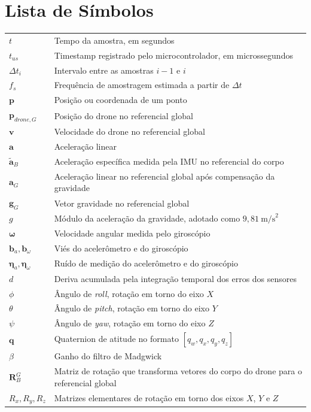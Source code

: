 \chapter*{Lista de Símbolos}

\begin{tabularx}{\textwidth}{>{\raggedright\arraybackslash}p{3.0cm} >{\raggedright\arraybackslash}X}
$t$ & Tempo da amostra, em segundos\\
$t_{us}$ & Timestamp registrado pelo microcontrolador, em microssegundos\\
$\Delta t_i$ & Intervalo entre as amostras $i-1$ e $i$\\
$f_s$ & Frequência de amostragem estimada a partir de $\Delta t$\\

$\mathbf{p}$ & Posição ou coordenada de um ponto\\
$\mathbf{p}_{drone,G}$ & Posição do drone no referencial global\\
$\mathbf{v}$ & Velocidade do drone no referencial global\\
$\mathbf{a}$ & Aceleração linear\\
$\tilde{\mathbf{a}}_B$ & Aceleração específica medida pela IMU no referencial do corpo\\
$\mathbf{a}_G$ & Aceleração linear no referencial global após compensação da gravidade\\
$\mathbf{g}_G$ & Vetor gravidade no referencial global\\
$g$ & Módulo da aceleração da gravidade, adotado como $9{,}81~\text{m/s}^2$\\

$\boldsymbol{\omega}$ & Velocidade angular medida pelo giroscópio\\
$\mathbf{b}_a,\mathbf{b}_\omega$ & Viés do acelerômetro e do giroscópio\\
$\boldsymbol{\eta}_a,\boldsymbol{\eta}_\omega$ & Ruído de medição do acelerômetro e do giroscópio\\
$d$ & Deriva acumulada pela integração temporal dos erros dos sensores\\

$\phi$ & Ângulo de \textit{roll}, rotação em torno do eixo $X$\\
$\theta$ & Ângulo de \textit{pitch}, rotação em torno do eixo $Y$\\
$\psi$ & Ângulo de \textit{yaw}, rotação em torno do eixo $Z$\\
$\mathbf{q}$ & Quaternion de atitude no formato $[q_w,q_x,q_y,q_z]$\\
$\beta$ & Ganho do filtro de Madgwick\\
$\mathbf{R}_{B}^{G}$ & Matriz de rotação que transforma vetores do corpo do drone para o referencial global\\
$R_x,R_y,R_z$ & Matrizes elementares de rotação em torno dos eixos $X$, $Y$ e $Z$\\


\end{tabularx}

